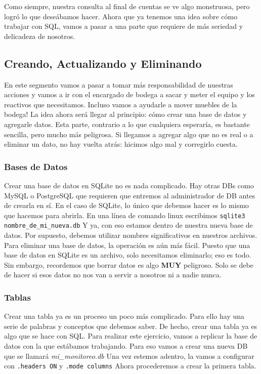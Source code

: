 \documentclass[10pt,letterpaper]{article}
\newcommand{\inlinecode}[1]{
\colorbox{light-gray}{\texttt{#1}}
}
\begin{document}
Como siempre, nuestra consulta al final de cuentas se ve algo monstruosa, pero logr\'o lo que dese\'abamos hacer. Ahora que ya tenemos una idea sobre c\'omo trabajar con SQL, vamos a pasar a una parte que requiere de m\'as seriedad y delicadeza de nosotros.

\subsection{Creando, Actualizando y Eliminando}
En este segmento vamos a pasar a tomar m\'as responsabilidad de nuestras acciones y vamos a ir con el encargado de bodega a sacar y meter el equipo y los reactivos que necesitamos. Incluso vamos a ayudarle a mover muebles de la bodega! La idea ahora ser\'a llegar al principio: c\'omo crear una base de datos y agregarle datos. Esta parte, contrario a lo que cualquiera esperar\'ia, es bastante sencilla, pero mucho m\'as peligrosa. Si llegamos a agregar algo que no es real o a eliminar un dato, no hay vuelta atr\'as: hicimos algo mal y corregirlo cuesta.

\subsubsection{Bases de Datos}
Crear una base de datos en SQLite no es nada complicado. Hay otras DBs como MySQL o PostgreSQL que requieren que entremos al administrador de DB antes de crearla en s\'i. En el caso de SQLite, lo \'unico que debemos hacer es lo mismo que hacemos para abrirla. En una l\'inea de comando linux escribimos \inlinecode{sqlite3 nombre\_de\_mi\_nueva.db} Y ya, con eso estamos dentro de nuestra nueva base de datos. Por supuesto, debemos utilizar nombres significativos en nuestros archivos.\\

Para eliminar una base de datos, la operaci\'on es a\'un m\'as f\'acil. Puesto que una base de datos en SQLite es un archivo, solo necesitamos eliminarlo; eso es todo. Sin embargo, recordemos que borrar datos es algo \textbf{MUY} peligroso. Solo se debe de hacer si esos datos no nos van a servir a nosotros ni a nadie nunca.

\subsubsection{Tablas}
Crear una tabla ya es un proceso un poco m\'as complicado. Para ello hay una serie de palabras y conceptos que debemos saber. De hecho, crear una tabla ya es algo que se hace con SQL. Para realizar este ejercicio, vamos a replicar la base de datos con la que est\'abamos trabajando. Para eso vamos a crear una nueva DB que se llamar\'a \emph{mi\_monitoreo.db} Una vez estemos adentro, la vamos a configurar con \inlinecode{.headers ON} y \inlinecode{.mode columns} Ahora procederemos a crear la primera tabla.
\end{document}
